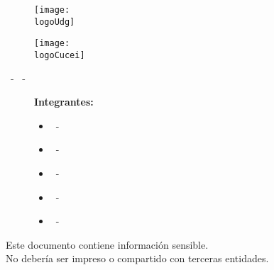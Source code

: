



    \begin{titlepage}
        \centering
        {\huge\textbf{\universidad}}\par
        \vspace{0.6cm}
        {\LARGE{\cede}}
        \vfill

        \begin{figure}[h]
            \begin{minipage}[t]{0.45\textwidth}
                \centering
                \texttt{[image: \\logoUdg]}
            \end{minipage}
            \hfill
            \begin{minipage}[t]{0.45\textwidth}
                \centering
                \texttt{[image: \\logoCucei]}
            \end{minipage}
        \end{figure}
        \vfill

        \Large{ \division\vfill \textbf{\carrera}\vfill \textbf{\materia}\par\vspace{3pt} \seccion\ - \clave\ - \nrc\vfill }

        {\LARGE{\textbf{\theTitle}}}
        \vfill

	\begin{figure}[h]
		\centering
		\begin{minipage}[t]{0.75\textwidth}
			{\Large
				\textbf{Integrantes:}\par\vspace{8pt}
				\begin{itemize}
					\item \theAuthor\ - \theAuthorCode
					\item \bAuthor\ - \bAuthorCode
					\item \cAuthor\ - \cAuthorCode
					\item \dAuthor\ - \dAuthorCode
					\item \eAuthor\ - \eAuthorCode
				\end{itemize}
			}
		\end{minipage}
	\end{figure}\vfill


        \begin{tcolorbox}
            [colback=red!5!white, colframe=red!75!black]
            \centering
            Este documento contiene información sensible.\\
			No debería ser impreso o compartido con terceras entidades.
        \end{tcolorbox}
        \vfill
        {\large \startDate}\par
    \end{titlepage}

